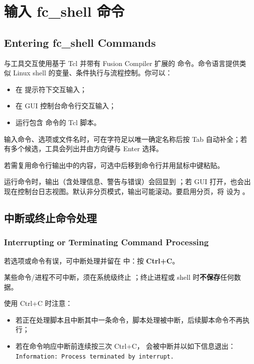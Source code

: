 \section{输入 fc\_shell 命令}
\subsection*{Entering fc\_shell Commands}

与工具交互使用基于 Tcl 并带有 Fusion Compiler 扩展的  命令。命令语言提供类似 Linux shell 的变量、条件执行与流程控制。你可以：
\begin{itemize}
  \item 在  提示符下交互输入；
  \item 在 GUI 控制台命令行交互输入；
  \item 运行包含  命令的 Tcl 脚本。
\end{itemize}

输入命令、选项或文件名时，可在字符足以唯一确定名称后按 Tab 自动补全；若有多个候选，工具会列出并由方向键与 Enter 选择。

若需复用命令行输出中的内容，可选中后移到命令行并用鼠标中键粘贴。

运行命令时，输出（含处理信息、警告与错误）会回显到 ；若 GUI 打开，也会出现在控制台日志视图。默认非分页模式，输出可能滚动。要启用分页，将  设为 。

\subsection{中断或终止命令处理}
\subsubsection*{Interrupting or Terminating Command Processing}

若选项或命令有误，可中断处理并留在  中：按 \textbf{Ctrl+C}。

某些命令/进程不可中断，须在系统级终止 ；终止进程或 shell 时\textbf{不保存}任何数据。

使用 Ctrl+C 时注意：
\begin{itemize}
  \item 若正在处理脚本且中断其中一条命令，脚本处理被中断，后续脚本命令不再执行；
  \item 若在命令响应中断前连续按三次 Ctrl+C， 会被中断并以如下信息退出：\\
        \texttt{Information: Process terminated by interrupt.}
\end{itemize}


